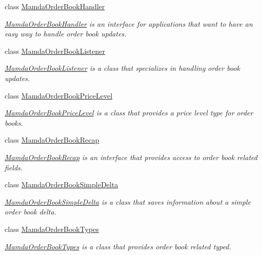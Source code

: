 \begin{CompactItemize}
class \hyperlink{classWombat_1_1MamdaOrderBookHandler}{Mamda\-Order\-Book\-Handler}
\begin{CompactList}\small\item\em \hyperlink{classWombat_1_1MamdaOrderBookHandler}{Mamda\-Order\-Book\-Handler} is an interface for applications that want to have an easy way to handle order book updates. \item\end{CompactList}\item 
class \hyperlink{classWombat_1_1MamdaOrderBookListener}{Mamda\-Order\-Book\-Listener}
\begin{CompactList}\small\item\em \hyperlink{classWombat_1_1MamdaOrderBookListener}{Mamda\-Order\-Book\-Listener} is a class that specializes in handling order book updates. \item\end{CompactList}\item 
class \hyperlink{classWombat_1_1MamdaOrderBookPriceLevel}{Mamda\-Order\-Book\-Price\-Level}
\begin{CompactList}\small\item\em \hyperlink{classWombat_1_1MamdaOrderBookPriceLevel}{Mamda\-Order\-Book\-Price\-Level} is a class that provides a price level type for order books. \item\end{CompactList}\item 
class \hyperlink{classWombat_1_1MamdaOrderBookRecap}{Mamda\-Order\-Book\-Recap}
\begin{CompactList}\small\item\em \hyperlink{classWombat_1_1MamdaOrderBookRecap}{Mamda\-Order\-Book\-Recap} is an interface that provides access to order book related fields. \item\end{CompactList}\item 
class \hyperlink{classWombat_1_1MamdaOrderBookSimpleDelta}{Mamda\-Order\-Book\-Simple\-Delta}
\begin{CompactList}\small\item\em \hyperlink{classWombat_1_1MamdaOrderBookSimpleDelta}{Mamda\-Order\-Book\-Simple\-Delta} is a class that saves information about a simple order book delta. \item\end{CompactList}\item 
class \hyperlink{classWombat_1_1MamdaOrderBookTypes}{Mamda\-Order\-Book\-Types}
\begin{CompactList}\small\item\em \hyperlink{classWombat_1_1MamdaOrderBookTypes}{Mamda\-Order\-Book\-Types} is a class that provides order book related typed. \item\end{CompactList}\item 

\end{CompactItemize}
